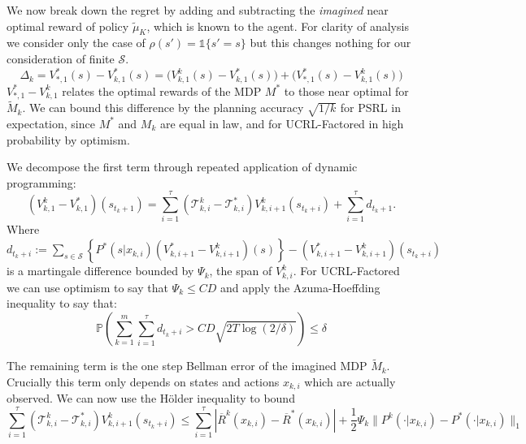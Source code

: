 \documentclass{article}
\newcommand{\Exp}{\mathds{E}}
\newcommand{\Prob}{\mathds{P}}
\newcommand{\Ind}{\mathds{1}}
\newcommand{\Sc}{\mathcal{S}}
\newcommand{\Mc}{\mathcal{M}}
\newcommand{\Tc}{\mathcal{T}}
\begin{document}
We now break down the regret by adding and subtracting the \emph{imagined} near optimal reward of policy $\tilde{\mu}_K$, which is known to the agent.
For clarity of analysis we consider only the case of $\rho(s') = \Ind \{s' = s \}$ but this changes nothing for our consideration of finite $\Sc$.
\begin{equation}
	\Delta_k =  V^*_{*,1}(s) - V^*_{k,1}(s) = \bigg( V^k_{k,1}(s) - V^*_{k,1}(s) \bigg) + \bigg(V^*_{*,1}(s) - V^k_{k,1}(s) \bigg)
\end{equation}
$V^*_{*,1} - V^k_{k,1}$ relates the optimal rewards of the MDP $M^*$ to those near optimal for $\tilde{M}_k$.
We can bound this difference by the planning accuracy $\sqrt{1/k}$ for PSRL in expectation, since $M^*$ and $M_k$ are equal in law, and for UCRL-Factored in high probability by optimism.

We decompose the first term through repeated application of dynamic programming:
\begin{equation}
	\left(V^k_{k,1} - V^*_{k,1} \right) (s_{t_k+1}) = \sum_{i=1}^\tau \left( \Tc^k_{k,i} - \Tc^*_{k,i} \right) V^k_{k,i+1}(s_{t_k+i}) + \sum_{i=1}^\tau d_{t_k+1}.
\end{equation}
Where $d_{t_k+i} := \sum_{s \in \Sc} \left\{ P^*(s | x_{k,i}) (V^*_{k,i+1}-V^k_{k,i+1})(s) \right\} - (V^*_{k,i+1} - V^k_{k,i+1})(s_{t_k+i})$
is a martingale difference bounded by $\Psi_k$, the span of $V^k_{k,i}$.
For UCRL-Factored we can use optimism to say that $\Psi_k \le CD$ \cite{jaksch2010near} and apply the Azuma-Hoeffding inequality to say that:
\begin{equation}
\label{eq: d_t}
	\Prob \left( \sum_{k=1}^m \sum_{i=1}^\tau d_{t_k+i} > CD\sqrt{2T\log(2/\delta)} \right) \le \delta
\end{equation}

The remaining term is the one step Bellman error of the imagined MDP $\tilde{M}_k$.
Crucially this term only depends on states and actions $x_{k,i}$ which are actually observed.
We can now use the H\"{o}lder inequality to bound
\begin{equation}
\label{eq: err sums}
	\sum_{i=1}^\tau \left( \Tc^k_{k,i} - \Tc^*_{k,i} \right) V^k_{k,i+1}(s_{t_k+i}) \le 
		\sum_{i=1}^\tau |\overline{R}^k(x_{k,i}) - \overline{R}^*(x_{k,i}) | + \frac{1}{2} \Psi_k \|P^k(\cdot|x_{k,i}) - P^*(\cdot|x_{k,i}) \|_1
\end{equation}
\end{document}

